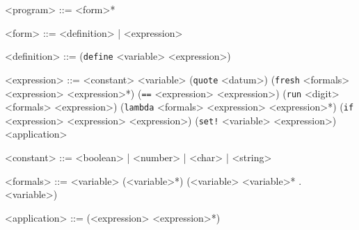 \setlength{\grammarparsep}{8pt} %
\setlength{\grammarindent}{8em} %
\begin{grammar}
    <program>     ::= <form>*

    <form>        ::= <definition> | <expression>

    <definition>  ::= (\texttt{define} <variable> <expression>)

    <expression>  ::= <constant>
    \indalt <variable>
    \indalt (\texttt{quote} <datum>)
    \indalt (\texttt{fresh} <formals> <expression> <expression>*)
    \indalt (\texttt{==} <expression> <expression>)
    \indalt (\texttt{run} <digit> <formals> <expression>)
    \indalt (\texttt{lambda} <formals> <expression> <expression>*)
    \indalt (\texttt{if} <expression> <expression> <expression>)
    \indalt (\texttt{set!} <variable> <expression>)
    \indalt <application>

    <constant>    ::= <boolean> | <number> | <char> | <string>

    <formals>     ::= <variable>
    \indalt (<variable>*)
    \indalt (<variable> <variable>* . <variable>)

    <application> ::= (<expression> <expression>*)
\end{grammar}
